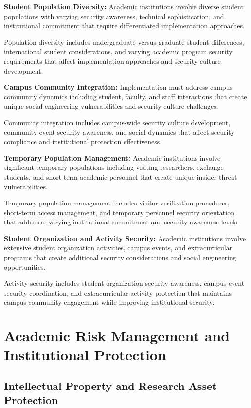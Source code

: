 \documentclass[10pt, twocolumn]{article}
\begin{document}
\textbf{Student Population Diversity:} Academic institutions involve diverse student populations with varying security awareness, technical sophistication, and institutional commitment that require differentiated implementation approaches.

Population diversity includes undergraduate versus graduate student differences, international student considerations, and varying academic program security requirements that affect implementation approaches and security culture development.

\textbf{Campus Community Integration:} Implementation must address campus community dynamics including student, faculty, and staff interactions that create unique social engineering vulnerabilities and security culture challenges.

Community integration includes campus-wide security culture development, community event security awareness, and social dynamics that affect security compliance and institutional protection effectiveness.

\textbf{Temporary Population Management:} Academic institutions involve significant temporary populations including visiting researchers, exchange students, and short-term academic personnel that create unique insider threat vulnerabilities.

Temporary population management includes visitor verification procedures, short-term access management, and temporary personnel security orientation that addresses varying institutional commitment and security awareness levels.

\textbf{Student Organization and Activity Security:} Academic institutions involve extensive student organization activities, campus events, and extracurricular programs that create additional security considerations and social engineering opportunities.

Activity security includes student organization security awareness, campus event security coordination, and extracurricular activity protection that maintains campus community engagement while improving institutional security.

\section{Academic Risk Management and Institutional Protection}

\subsection{Intellectual Property and Research Asset Protection}
\end{document}

